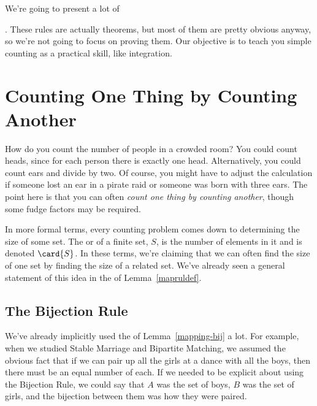 We're going to present a lot of .  These rules are actually theorems, but most of them are
pretty obvious anyway, so we're not going to focus on proving them.
Our objective is to teach you simple counting as a practical skill,
like integration.
\fi


\section{Counting One Thing by Counting Another}\label{bijection_counting_sec}
\iffalse

How do you count the number of people in a crowded room?  You could count
heads, since for each person there is exactly one head.  Alternatively,
you could count ears and divide by two.  Of course, you might have to
adjust the calculation if someone lost an ear in a pirate raid or someone
was born with three ears.  The point here is that you can often
\emph{count one thing by counting another}, though some fudge factors
may be required.  \iffalse This is a central theme of counting, from the
easiest problems to the hardest.\fi

In more formal terms, every counting problem comes down to determining
the size of some set.  The  or  of a
finite set, $S$, is the number of elements in it and is denoted
 $\card{S}$.  In these terms,
we're claiming that we can often find the size of one set by finding
the size of a related set.  We've already seen a general statement of
  this idea in the  of Lemma~\ref{mapruldef}.



\subsection{The Bijection Rule}

We've already implicitly used the  of
Lemma~\ref{mapping-bij} a lot.  For example, when we studied Stable
Marriage and Bipartite Matching, we assumed the obvious fact that if we
can pair up all the girls at a dance with all the boys, then there must be
an equal number of each.  If we needed to be explicit about using the
Bijection Rule, we could say that $A$ was the set of boys, $B$ was the set
of girls, and the bijection between them was how they were paired.

